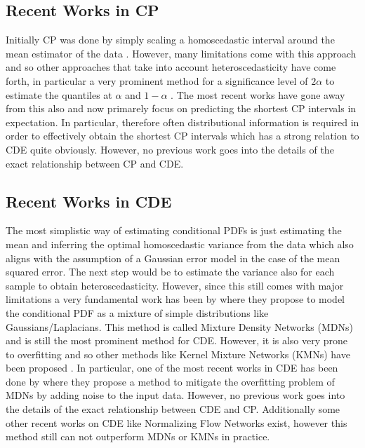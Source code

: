 \subsection{Recent Works in CP}

Initially CP was done by simply scaling a homoscedastic interval around the mean estimator of the data \cite{lei2018distribution}. However, many limitations come with this approach and so other approaches that take into account heteroscedasticity have come forth, in particular a very prominent method for a significance level of $2 \alpha$ to estimate the quantiles at $\alpha$ and $1 - \alpha$ \cite{romano2019conformalized}. The most recent works have gone away from this also and now primarely focus on predicting the shortest CP intervals \cite{sesia2021conformal,chernozhukov2021distributional,izbicki2022cd} in expectation. In particular, therefore often distributional information is required in order to effectively obtain the shortest CP intervals which has a strong relation to CDE quite obviously. However, no previous work goes into the details of the exact relationship between CP and CDE.

\subsection{Recent Works in CDE}

The most simplistic way of estimating conditional PDFs is just estimating the mean and inferring the optimal homoscedastic variance from the data which also aligns with the assumption of a Gaussian error model in the case of the mean squared error. The next step would be to estimate the variance also for each sample to obtain heteroscedasticity. However, since this still comes with major limitations a very fundamental work has been by \cite{bishop1994mixture} where they propose to model the conditional PDF as a mixture of simple distributions like Gaussians/Laplacians. This method is called Mixture Density Networks (MDNs) and is still the most prominent method for CDE. However, it is also very prone to overfitting and so other methods like Kernel Mixture Networks (KMNs) have been proposed \cite{ambrogioni2017kernel}. In particular, one of the most recent works in CDE has been done by \cite{rothfuss2019noise} where they propose a method to mitigate the overfitting problem of MDNs by adding noise to the input data. However, no previous work goes into the details of the exact relationship between CDE and CP. Additionally some other recent works on CDE like Normalizing Flow Networks \cite{trippe2018conditional} exist, however this method still can not outperform MDNs or KMNs in practice.

